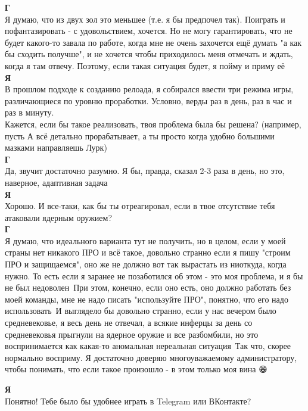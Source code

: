 \textbf{Г}\\
Я думаю, что из двух зол это меньшее (т.е. я бы предпочел так). Поиграть и пофантазировать - с удовольствием, хочется. Но не могу гарантировать, что не будет какого-то завала по работе, когда мне не очень захочется ещё думать "а как бы сходить получше", и не хочется чтобы приходилось меня отмечать и ждать, когда я там отвечу. Поэтому, если такая ситуация будет, я пойму и приму её\\

\textbf{Я}\\
В прошлом подходе к созданию релоада, я собирался ввести три режима игры, различающиеся по уровню проработки. Условно, верды раз в день, раз в час и раз в минуту.\\
Кажется, если бы такое реализовать, твоя проблема была бы решена? (например, пусть А всё детально прорабатывает, а ты просто когда удобно большими мазками направляешь Лурк)\\

\textbf{Г}\\
Да, звучит достаточно разумно. Я бы, правда, сказал 2-3 раза в день, но это, наверное, адаптивная задача\\

\textbf{Я}\\
Хорошо. И все-таки, как бы ты отреагировал, если в твое отсутствие тебя атаковали ядерным оружием?\\

\textbf{Г}\\
Я думаю, что идеального варианта тут не получить, но в целом, если у моей страны нет никакого ПРО и всё такое, довольно странно если я пишу "строим ПРО и защищаемся", оно же не должно вот так вырастать из ниоткуда, когда нужно. То есть если я заранее не позаботился об этом - это моя проблема, и я бы не был недоволен\
При этом, конечно, если оно есть, оно должно работать без моей команды, мне не надо писать "используйте ПРО", понятно, что его надо использовать\
И выглядело бы довольно странно, если у нас вечером было средневековье, я весь день не отвечал, а всякие инферцы за день со средневековья прыгнули на ядерное оружие и все разбомбили, но это воспринимается как какая-то аномальная нереальная ситуация\
Так что, скорее нормально восприму. Я достаточно доверяю многоуважаемому администратору, чтобы понимать, что если такое произошло - в этом только моя вина 😁🙏

\textbf{Я}\\
Понятно! Тебе было бы удобнее играть в Telegram или ВКонтакте?\\

